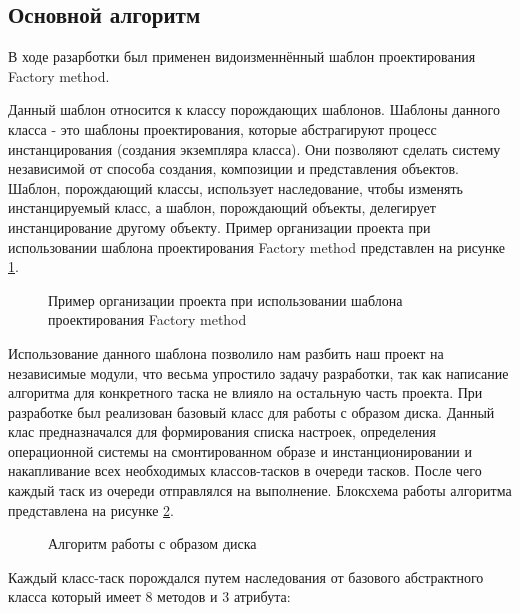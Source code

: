 \subsection{Основной алгоритм}
В ходе разарботки был применен видоизменнённый шаблон проектирования Factory method.

Данный шаблон относится к классу порождающих шаблонов. Шаблоны данного класса - это шаблоны проектирования, которые абстрагируют процесс инстанцирования (создания экземпляра класса). Они позволяют сделать систему независимой от способа создания, композиции и представления объектов. Шаблон, порождающий классы, использует наследование, чтобы изменять инстанцируемый класс, а шаблон, порождающий объекты, делегирует инстанцирование другому объекту.
Пример организации проекта при использовании шаблона проектирования Factory method представлен на рисунке \ref{architech:architech}.

\begin{figure}[h!]
\caption{Пример организации проекта при использовании шаблона проектирования Factory method}
\label{architech:architech}
\end{figure}

Использование данного шаблона позволило нам разбить наш проект на независимые модули, что весьма упростило задачу разработки, так как написание алгоритма для конкретного таска не влияло на остальную часть проекта. При разработке был реализован базовый класс для работы с образом диска. Данный клас предназначался для формирования списка настроек, определения операционной системы на смонтированном образе и инстанционировании и накапливание всех необходимых классов-тасков в очереди тасков. После чего каждый таск из очереди отправлялся на выполнение. Блоксхема работы алгоритма представлена на рисунке \ref{alg_main:alg_main}.

\begin{figure}[h!]
\caption{Алгоритм работы с образом диска}
\label{alg_main:alg_main}
\end{figure}

Каждый класс-таск порождался путем наследования от базового абстрактного класса который имеет 8 методов и 3 атрибута:

